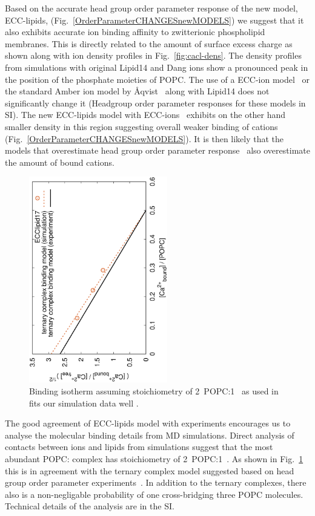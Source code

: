 \documentclass[aip,jcp,twocolumn]{revtex4}
\begin{document}
Based on the accurate head group order parameter response of the new model, ECC-lipids, (Fig.~\ref{OrderParameterCHANGESnewMODELS})
we suggest that it also exhibits accurate ion binding affinity to zwitterionic phospholipid membranes.
This is directly related to the amount of surface excess charge 
as shown along with ion density profiles in Fig.~\ref{fig:cacl-dens}.
The density profiles from simulations with original Lipid14 \cite{dickson14} and Dang ions \cite{smith94,chang1999,dang2006} 
show a pronounced peak in the position of the phosphate moieties of POPC. 
The use of a ECC-ion model~\cite{Jungwirth2017,Jungwirth2015,kohagen14,kohagen16}
or the standard Amber ion model by \AA{qvist}~\cite{aqvist90}
along with Lipid14 does not significantly change it 
(Headgroup order parameter responses for these models in SI).
The new ECC-lipids model with ECC-ions~\cite{Jungwirth2017,Jungwirth2015,kohagen14,kohagen16} exhibits on the other hand smaller density in this region 
suggesting overall weaker binding of cations (Fig.~\ref{OrderParameterCHANGESnewMODELS}). 
It is then likely that the models that overestimate head group order parameter response~\cite{catte16} also overestimate the amount of bound cations.


\begin{figure}[]
  \centering
  \includegraphics[height=9.0cm,angle=-90]{../Fig/bound-CAs_conc-eccl17.eps}
  \caption{\label{fig:cacl-bind}
    Binding isotherm assuming stoichiometry of 2~POPC:1~ as used in \cite{altenbach84} fits our simulation data well .
    }
\end{figure}


The good agreement of ECC-lipids model with experiments encourages us to analyse the
molecular binding details from MD simulations. Direct analysis of contacts between ions and
lipids from simulations suggest that the most abundant POPC: complex 
has stoichiometry of 2~POPC:1~.
As shown in Fig.~\ref{fig:cacl-bind} this is in agreement
with the ternary complex model suggested based on head group order parameter
experiments~\cite{altenbach84}.
In addition to the ternary complexes, there also is a non-negligable probability
of one  cross-bridging three POPC molecules.
Technical details of the analysis are in the SI. 
\end{document}
